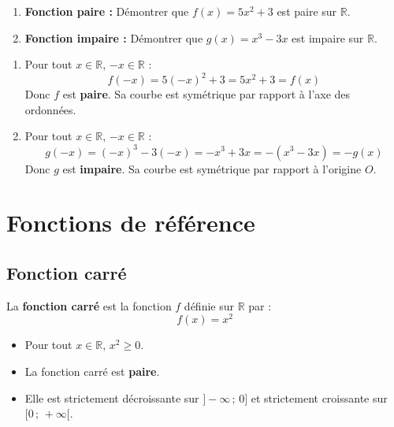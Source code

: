 \begin{methode}
	\nline
	\begin{enumerate}
		\item \textbf{Fonction paire :} Démontrer que $f(x) = 5x^2 + 3$ est paire sur $\mathbb{R}$.
		\item \textbf{Fonction impaire :} Démontrer que $g(x) = x^3 - 3x$ est impaire sur $\mathbb{R}$.
	\end{enumerate}

	\begin{correction}
		\nline
		\begin{enumerate}
			\item Pour tout $x \in \mathbb{R}$, $-x \in \mathbb{R}$ :
			      \[
				      f(-x) = 5(-x)^2 + 3 = 5x^2 + 3 = f(x)
			      \]
			      Donc $f$ est \textbf{paire}. Sa courbe est symétrique par rapport à l'axe des ordonnées.

			\item Pour tout $x \in \mathbb{R}$, $-x \in \mathbb{R}$ :
			      \[
				      g(-x) = (-x)^3 - 3(-x) = -x^3 + 3x = -(x^3 - 3x) = -g(x)
			      \]
			      Donc $g$ est \textbf{impaire}. Sa courbe est symétrique par rapport à l'origine $O$.
		\end{enumerate}
	\end{correction}
\end{methode}

\newpage

\section{Fonctions de référence}

\subsection{Fonction carré}

\begin{defin}
	La \textbf{fonction carré} est la fonction $f$ définie sur $\mathbb{R}$ par :
	\[
		f(x) = x^2
	\]
\end{defin}

\begin{prop}
	\nline
	\begin{itemize}
		\item Pour tout $x \in \mathbb{R}$, $x^2 \ge 0$.
		\item La fonction carré est \textbf{paire}.
		\item Elle est strictement décroissante sur $] - \infty\,;\,0]$ et strictement croissante sur $[0\,;\, + \infty[$.
	\end{itemize}

	\begin{center}
	\end{center}
\end{prop}

